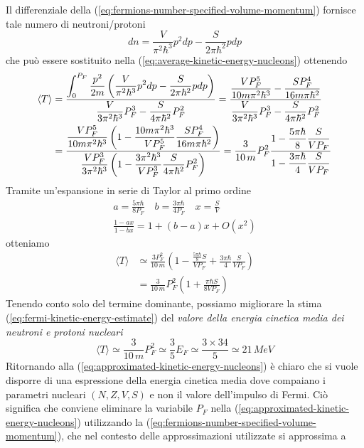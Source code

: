 Il differenziale della (\ref{eq:fermions-number-specified-volume-momentum}) fornisce tale numero di neutroni/protoni
\[
dn = \frac{V}{\pi^{2}\hbar^{3}} p^{2}dp - \frac{S}{2 \pi \hbar^{2}} pdp
\]
che può essere sostituito nella (\ref{eq:average-kinetic-energy-nucleons}) ottenendo
\begin{align*}
    \langle T \rangle &= \fraclarg{\int_{0}^{P_{F}} \frac{p^{2}}{ 2m}\left(\frac{V}{\pi^{2}\hbar^{3}} p^{2}dp - \frac{S}{2 \pi \hbar^{2}} pdp \right)  }{\frac{V}{3\pi^{2}\hbar^{3}} P_{F}^{3} - \frac{S}{4 \pi \hbar^{2}} P_{F}^{2} }
    = \fraclarg{\frac{VP_{F}^{5}}{10m\pi^{2}\hbar^{3}} - \frac{SP_{F}^{4}}{16m\pi \hbar^{2}}}{\frac{V}{3\pi^{2}\hbar^{3}} P_{F}^{3} - \frac{S}{4 \pi \hbar^{2}} P_{F}^{2}}\\
    &= \fraclarg{\frac{VP_{F}^{5}}{10m \pi^{2}\hbar^{3}}\left( 1 - \frac{10m\pi^{2}\hbar^{3}}{VP_{F}^{5}} \frac{SP_F^{4}}{16 m \pi \hbar^{2}} \right)}{\frac{VP_{F}^{3}}{3\pi^{2}\hbar^{3}}\left( 1 - \frac{3\pi^{2}\hbar^{3}}{VP_{F}^{3}} \frac{S}{4 \pi \hbar^{2}}P_{F}^{2} \right)}
	= \frac{3}{10 \,m}P_{F}^{2} \fraclarg{1 - \frac{5\pi \hbar}{8} \frac{S}{VP_{F}}}{1 - \frac{3\pi \hbar}{4} \frac{S}{VP_{F}}}
\end{align*}
Tramite un'espansione in serie di Taylor al primo ordine
\begin{gather*}
    a = \frac{5\pi \hbar}{8 P_{F}} \quad b = \frac{3\pi \hbar}{4 P_{F}} \quad x = \frac{S}{V}\\
    \frac{1-ax}{1-bx} = 1 + (b-a)x + O(x^{2})
\end{gather*}
otteniamo
\begin{align}
    \langle T \rangle &\simeq  \frac{3P_{F}^{2}}{10 \, m} \left( 1 - \frac{\frac{5\pi \hbar}{8}S}{VP_{F}}+ \frac{3\pi \hbar}{4} \frac{S}{V P_{F}} \right) \nonumber\\
     &= \frac{3}{10 \, m}P_{F}^{2} \left( 1 + \frac{\pi\hbar S}{8 V P_{F}} \right)
	\label{eq:approximated-kinetic-energy-nucleons}
\end{align}
Tenendo conto solo del termine dominante, possiamo migliorare la stima (\ref{eq:fermi-kinetic-energy-estimate}) del \emph{valore della energia cinetica media dei neutroni e protoni nucleari}
\[
\langle T \rangle \simeq \frac{3}{10 \, m} P_{F}^{2} \simeq \frac{3}{5}E_{F} \simeq \frac{3 \times 34}{5} \simeq 21 \, MeV
\]
Ritornando alla (\ref{eq:approximated-kinetic-energy-nucleons}) è chiaro che si vuole disporre di una espressione della energia cinetica media dove compaiano i parametri nucleari $(N, Z, V, S)$ e non il valore dell’impulso di Fermi.
Ciò significa che conviene eliminare la variabile $P_{F}$ nella (\ref{eq:approximated-kinetic-energy-nucleons}) utilizzando la (\ref{eq:fermions-number-specified-volume-momentum}), che nel contesto delle approssimazioni utilizzate si approssima a
